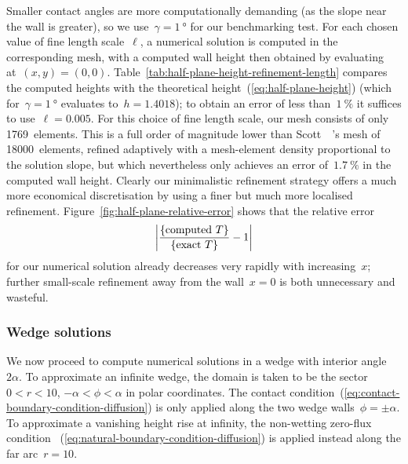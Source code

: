 Smaller contact angles are more computationally demanding
(as the slope near the wall is greater),
so we use~$\gamma = \SI{1}{\degree}$ for our benchmarking test.
For each chosen value of fine length scale~$\ell$,
a numerical solution is computed in the corresponding mesh,
with a computed wall height then obtained
by evaluating at~$(x, y) = (0, 0)$.
Table~\ref{tab:half-plane-height-refinement-length}
compares the computed heights
with the theoretical height~(\ref{eq:half-plane-height})
(which for~$\gamma = \SI{1}{\degree}$ evaluates to~$h = 1.4018$);
to obtain an error of less than~$\SI{1}{\percent}$
it suffices to use~$\ell = 0.005$.
For this choice of fine length scale,
our mesh consists of only 1769~elements.
This is a full order of magnitude lower than
Scott~\etal~\cite{scott-2005-computation-capillary-laplace-young}'s
mesh of 18000~elements, refined adaptively
with a mesh-element density proportional to the solution slope,
but which nevertheless only achieves an error of~$\SI{1.7}{\percent}$
in the computed wall height.
Clearly our minimalistic refinement strategy
offers a much more economical discretisation
by using a finer but much more localised refinement.
Figure~\ref{fig:half-plane-relative-error}
shows that the relative error
\begin{equation}
  \abs*{\frac{\textq{computed~$T$}}{\textq{exact~$T$}} - 1}
  \label{eq:half-plane-relative-error}
\end{equation}
for our numerical solution already decreases very rapidly
with increasing~$x$;
further small-scale refinement away from the wall~$x = 0$
is both unnecessary and wasteful.

\begin{figure}
\end{figure}

\subsubsection{Wedge solutions}
\label{sec:moderate.nonlinear.numerical.wedge}

We now proceed to compute numerical solutions
in a wedge with interior angle~$2 \alpha$.
To approximate an infinite wedge,
the domain is taken to be the sector
$0 < r < 10$, $-\alpha < \phi < \alpha$
in polar coordinates.
The contact condition~(\ref{eq:contact-boundary-condition-diffusion})
is only applied along the two wedge walls~$\phi = \pm \alpha$.
To approximate a vanishing height rise at infinity,
the non-wetting zero-flux condition~%
  (\ref{eq:natural-boundary-condition-diffusion})
is applied instead along the far arc~$r = 10$.

